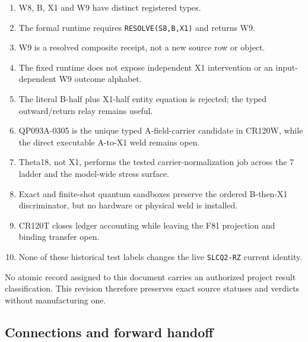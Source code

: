 \begin{enumerate}
\def\labelenumi{\arabic{enumi}.}
\tightlist
\item
  W8, B, X1 and W9 have distinct registered types.
\item
  The formal runtime requires \texttt{RESOLVE(S8,B,X1)} and returns W9.
\item
  W9 is a resolved composite receipt, not a new source row or object.
\item
  The fixed runtime does not expose independent X1 intervention or an
  input-dependent W9 outcome alphabet.
\item
  The literal B-half plus X1-half entity equation is rejected; the typed
  outward/return relay remains useful.
\item
  QP093A-0305 is the unique typed A-field-carrier candidate in CR120W,
  while the direct executable A-to-X1 weld remains open.
\item
  Theta18, not X1, performs the tested carrier-normalization job across
  the 7 ladder and the model-wide stress surface.
\item
  Exact and finite-shot quantum sandboxes preserve the ordered B-then-X1
  discriminator, but no hardware or physical weld is installed.
\item
  CR120T closes ledger accounting while leaving the F81 projection and
  binding transfer open.
\item
  None of these historical test labels changes the live
  \texttt{SLCQ2-RZ} current identity.
\end{enumerate}

No atomic record assigned to this document carries an authorized project
result classification. This revision therefore preserves exact source
statuses and verdicts without manufacturing one.

\subsection{Connections and forward
handoff}\label{viii-ch05-connections-and-forward-handoff}

